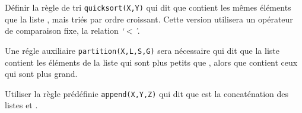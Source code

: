 \begin{Exercise}
Définir la règle de tri \verb|quicksort(X,Y)| qui dit que  contient
les mêmes éléments que la liste , mais triés par ordre croissant.
Cette version utilisera un opérateur de comparaison fixe, la relation
\textsl{`}$<$\textsl{'}.

Une régle auxiliaire \verb|partition(X,L,S,G)| sera nécessaire qui dit
que la liste  contient les éléments de la liste  qui sont plus
petits que , alors que  contient ceux qui sont plus grand.

Utiliser la règle prédéfinie \verb|append(X,Y,Z)| qui dit que  est la
concaténation des listes  et .
\end{Exercise}